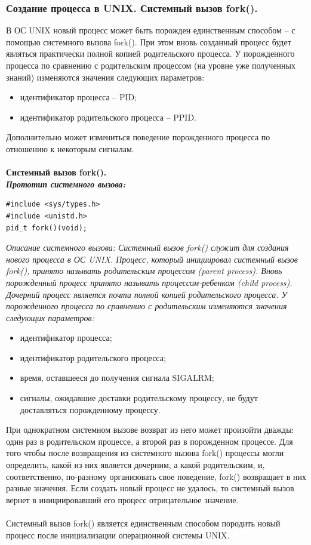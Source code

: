 \documentclass[a4paper]{article}
\begin{document}
\subsubsection{\Large Создание процесса в UNIX. Системный вызов fork().}
В ОС UNIX новый процесс может быть порожден единственным способом – с помощью системного вызова fork(). При этом вновь созданный процесс будет являться практически полной копией родительского процесса. У порожденного процесса по сравнению с родительским
процессом (на уровне уже полученных знаний) изменяются значения следующих параметров:
\begin{itemize}
  \item идентификатор процесса – PID;
  \item идентификатор родительского процесса – PPID.
\end{itemize}
Дополнительно может измениться поведение порожденного процесса по отношению к некоторым сигналам.\\\\
\bf Системный вызов fork(). \\
\sl Прототип системного вызова:
\begin{verbatim}
#include <sys/types.h>
#include <unistd.h>
pid_t fork()(void);
\end{verbatim}
\sl Описание системного вызова:
\rm Системный вызов fork() служит для создания нового процесса в ОС UNIX. Процесс, который инициировал системный вызов fork(), принято называть родительским процессом (parent process). Вновь порожденный процесс принято называть процессом-ребенком (child process). Дочерний процесс является почти полной копией родительского процесса. У порожденного процесса по сравнению с родительским изменяются значения следующих параметров:
\begin{itemize}
  \item идентификатор процесса;
  \item идентификатор родительского процесса;
  \item время, оставшееся до получения сигнала SIGALRM;
  \item сигналы, ожидавшие доставки родительскому процессу, не будут доставляться порожденному процессу.
\end{itemize}
При однократном системном вызове возврат из него может произойти дважды: один раз в родительском процессе, а второй раз в порожденном процессе. Для того чтобы после возвращения из системного вызова fork() процессы могли определить, какой из них является дочерним, а какой родительским, и, соответственно, по-разному организовать свое поведение, fork() возвращает в них разные значения. Если создать новый процесс не удалось, то системный вызов вернет в инициировавший его процесс отрицательное значение.\\\\
Системный вызов fork() является единственным способом породить новый процесс после инициализации операционной системы UNIX.
\end{document}
